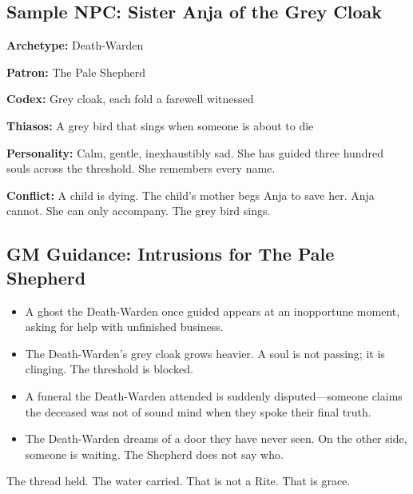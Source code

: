 \subsection{Sample NPC: Sister Anja of the Grey Cloak}

\textbf{Archetype:} Death-Warden

\textbf{Patron:} The Pale Shepherd

\textbf{Codex:} Grey cloak, each fold a farewell witnessed

\textbf{Thiasos:} A grey bird that sings when someone is about to die

\textbf{Personality:} Calm, gentle, inexhaustibly sad. She has guided three hundred souls across the threshold. She remembers every name.

\textbf{Conflict:} A child is dying. The child's mother begs Anja to save her. Anja cannot. She can only accompany. The grey bird sings.

\subsection{GM Guidance: Intrusions for The Pale Shepherd}

\begin{itemize}
\item A ghost the Death-Warden once guided appears at an inopportune moment, asking for help with unfinished business.
\item The Death-Warden's grey cloak grows heavier. A soul is not passing; it is clinging. The threshold is blocked.
\item A funeral the Death-Warden attended is suddenly disputed—someone claims the deceased was not of sound mind when they spoke their final truth.
\item The Death-Warden dreams of a door they have never seen. On the other side, someone is waiting. The Shepherd does not say who.
\end{itemize}

The thread held. The water carried. That is not a Rite. That is grace.
